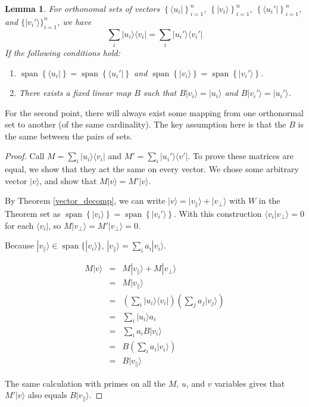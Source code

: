 \documentclass{amsbook}
\newtheorem{lemma}[theorem]{Lemma}
\begin{document}
\begin{lemma}
\label{rebase_projections}
For orthonomal sets of vectors $\left\{\langle u_i|\right\}_{i=1}^n$, $\left\{|v_i\rangle\right\}_{i=1}^n$, $\left\{\langle u_i'|\right\}_{i=1}^n$, and $\{|v_i'\rangle\}_{i=1}^n$, we have
$$
\sum_i|u_i\rangle\langle v_i|=\sum_i|u_i'\rangle\langle v_i'|
$$
If the following conditions hold:
\begin{enumerate}
\item $\operatorname{span}\left\{\langle u_i|\right\}=\operatorname{span}\left\{\langle u_i'|\right\}$ and $\operatorname{span}\left\{|v_i\rangle\right\}=\operatorname{span}\left\{|v_i'\rangle\right\}$.
\item There exists a fixed linear map $B$ such that $B|v_i\rangle=|u_i\rangle$ and $B|v_i'\rangle=|u_i'\rangle$.
\end{enumerate}
\end{lemma}

For the second point, there will always exist some mapping from one orthonormal set to another (of the same cardinality).  The key assumption here is that the $B$ is the same between the pairs of sets.

\begin{proof}
Call $M=\sum_i|u_i\rangle\langle v_i|$ and $M'=\sum_i|u_i'\rangle\langle v'|$.  To prove these matrices are equal, we show that they act the same on every vector.  We chose some arbitrary vector $|v\rangle$, and show that $M|v\rangle=M'|v\rangle$.

By Theorem \ref{vector_decomp}, we can write $|v\rangle=|v_\parallel\rangle+|v_\bot\rangle$ with $W$ in the Theorem set as $\operatorname{span}\left\{|v_i\rangle\right\}=\operatorname{span}\left\{|v_i'\rangle\right\}$.  With this construction $\langle v_i|v_\bot\rangle=0$ for each $\langle v_i|$, so $M|v_\bot\rangle=M'|v_\bot\rangle=0$.

Because $|v_\parallel\rangle\in\operatorname{span}\{|v_i\rangle\}$, $|v_\parallel\rangle=\sum_ia_i|v_i\rangle$.

$$
\begin{array}{rcl}
M|v\rangle &=& M|v_\parallel\rangle+M|v_\bot\rangle \\
 &=& M|v_\parallel\rangle \\
 &=& \left(\sum_i|u_i\rangle\langle v_i|\right)\left(\sum_ja_j|v_j\rangle\right) \\
 &=& \sum_i|u_i\rangle a_i \\
 &=& \sum_ia_iB|v_i\rangle \\
 &=& B\left(\sum_ia_i|v_i\rangle\right) \\
 &=& B|v_\parallel\rangle
\end{array}
$$

The same calculation with primes on all the $M$, $u$, and $v$ variables gives that $M'|v\rangle$ also equals $B|v_\parallel\rangle$.  
\end{proof}
\end{document}
